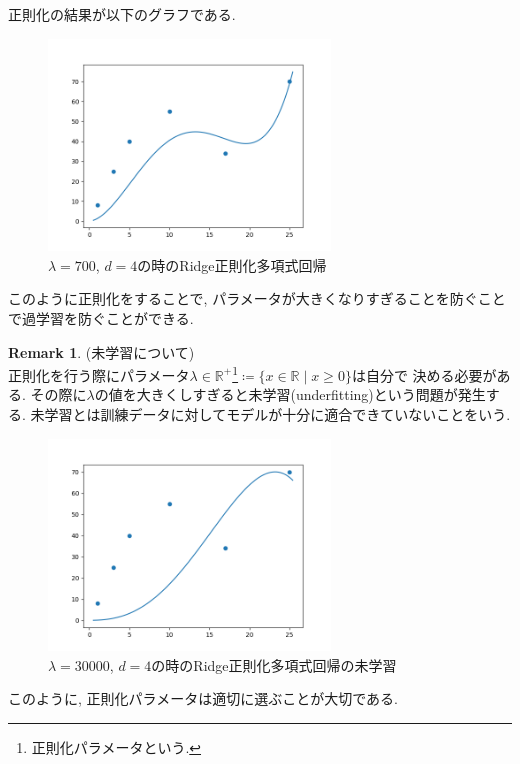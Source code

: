 \documentclass[11pt, a4paper, dvipdfmx]{jsarticle}
\theoremstyle{definition}
\newtheorem{Remark+}[Axiom+]{Remark}
\newcommand{\R}{\mathbb{R}}
\begin{document}
正則化の結果が以下のグラフである.
\begin{figure}[H]
    \centering
    \includegraphics[width = 7.5cm]{Images/regulaer_PR.png}
    \caption{$\lambda = 700$, $d = 4$の時のRidge正則化多項式回帰}
\end{figure}
このように正則化をすることで, パラメータが大きくなりすぎることを防ぐことで過学習を防ぐことができる.
\begin{Remark+}(未学習について)\\
    正則化を行う際にパラメータ$\lambda\in\R^+$\footnote{正則化パラメータという.}$\coloneqq\{x\in\R\mid x\geq0\}$は自分で
    決める必要がある. その際に$\lambda$の値を大きくしすぎると未学習(underfitting)という問題が発生する.
    未学習とは訓練データに対してモデルが十分に適合できていないことをいう.
    \begin{figure}[H]
        \centering
        \includegraphics[width=7.5cm]{Images/underfitting_PR.png}
        \caption{$\lambda = 30000$, $d = 4$の時のRidge正則化多項式回帰の未学習}
    \end{figure}
    このように, 正則化パラメータは適切に選ぶことが大切である. 
\end{Remark+}
\end{document}
